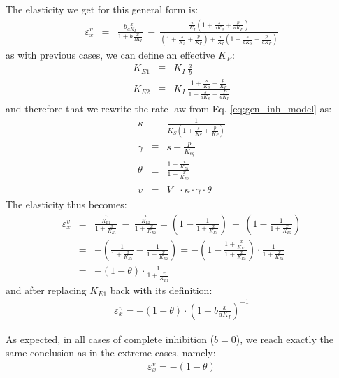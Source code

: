 \documentclass[12pt,a4paper]{article}
\begin{document}
The elasticity we get for this general form is:
\begin{eqnarray}
\varepsilon_x^v &=& \frac{b \frac{x}{aK_I}}{1 + b \frac{x}{aK_I}} ~-~ \frac{\frac{x}{K_I} \left(1 + \frac{s}{aK_S} + \frac{p}{aK_P}\right)}{\left(1 + \frac{s}{K_S} + \frac{p}{K_P}\right) + \frac{x}{K_I} \left(1 + \frac{s}{aK_S} + \frac{p}{aK_P}\right)}
\end{eqnarray}
as with previous cases, we can define an effective $K_E$:
\begin{eqnarray}
    K_{E1} & \equiv & K_I ~ \frac{a}{b} \\
    K_{E2} & \equiv & K_I ~ \frac{1 + \frac{s}{K_S} + \frac{p}{K_P}}{1 + \frac{s}{aK_S} + \frac{P}{aK_P}}
\end{eqnarray}
and therefore that we rewrite the rate law from Eq. \ref{eq:gen_inh_model} as:
\begin{eqnarray}
\kappa &\equiv& \frac{1}{K_S \left(1 + \frac{s}{K_S} + \frac{p}{K_P}\right)} \nonumber \\
\gamma &\equiv& s - \frac{p}{K_{eq}} \nonumber \\
\theta &\equiv& \frac{1 + \frac{x}{K_{E1}}}{1 + \frac{x}{K_{E2}}} \nonumber \\
v &=& V^+ \cdot \kappa \cdot \gamma \cdot \theta
\end{eqnarray}
The elasticity thus becomes:
\begin{eqnarray}
\varepsilon_x^v &=& 
	\frac{\frac{x}{K_{E1}}}{1 + \frac{x}{K_{E1}}} ~-~ \frac{\frac{x}{K_{E2}}}{1 + \frac{x}{K_{E2}}} = 
	\left( 1 - \frac{1}{1 + \frac{x}{K_{E1}}} \right) ~-~ \left(1 - \frac{1}{1 + \frac{x}{K_{E2}}} \right) \nonumber\\
	&=& -\left(\frac{1}{1 + \frac{x}{K_{E1}}} -  \frac{1}{1 + \frac{x}{K_{E2}}} \right) = 
	-\left( 1 -  \frac{1 + \frac{x}{K_{E1}}}{1 + \frac{x}{K_{E2}}} \right) \cdot \frac{1}{1 + \frac{x}{K_{E1}}} \nonumber\\
	&=& -(1 - \theta) \cdot  \frac{1}{1 + \frac{x}{K_{E1}}}
\end{eqnarray}
and after replacing $K_{E1}$ back with its definition:
\begin{eqnarray}
	\varepsilon_x^v = -\left(1 - \theta\right) \cdot  \left( 1 + b \frac{x}{aK_I} \right)^{-1}
\end{eqnarray}

As expected, in all cases of complete inhibition ($b = 0$), we reach exactly the same conclusion as in the extreme cases, namely:
\begin{eqnarray}
\varepsilon_x^v = -(1 - \theta) \label{eq:eps_general_inh}
\end{eqnarray}
\end{document}
